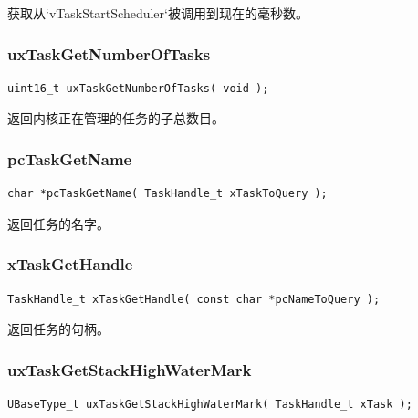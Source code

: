 \documentclass[12pt, a4paper]{article}
\begin{document}
获取从`vTaskStartScheduler`被调用到现在的毫秒数。

\subsubsection {uxTaskGetNumberOfTasks}

\begin{lstlisting}[language={[ANSI]C},keywordstyle=\color{blue!70},commentstyle=\color{red!50!green!50!blue!50},frame=shadowbox, rulesepcolor=\color{red!20!green!20!blue!20}]
uint16_t uxTaskGetNumberOfTasks( void );
\end{lstlisting}

返回内核正在管理的任务的子总数目。

\subsubsection {pcTaskGetName}

\begin{lstlisting}[language={[ANSI]C},keywordstyle=\color{blue!70},commentstyle=\color{red!50!green!50!blue!50},frame=shadowbox, rulesepcolor=\color{red!20!green!20!blue!20}]
char *pcTaskGetName( TaskHandle_t xTaskToQuery );
\end{lstlisting}

返回任务的名字。

\subsubsection {xTaskGetHandle}

\begin{lstlisting}[language={[ANSI]C},keywordstyle=\color{blue!70},commentstyle=\color{red!50!green!50!blue!50},frame=shadowbox, rulesepcolor=\color{red!20!green!20!blue!20}]
TaskHandle_t xTaskGetHandle( const char *pcNameToQuery );
\end{lstlisting}

返回任务的句柄。

\subsubsection {uxTaskGetStackHighWaterMark}

\begin{lstlisting}[language={[ANSI]C},keywordstyle=\color{blue!70},commentstyle=\color{red!50!green!50!blue!50},frame=shadowbox, rulesepcolor=\color{red!20!green!20!blue!20}]
UBaseType_t uxTaskGetStackHighWaterMark( TaskHandle_t xTask );
\end{lstlisting}
\end{document}

